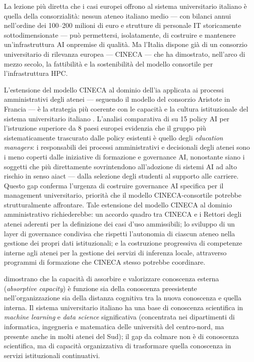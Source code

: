 La lezione più diretta che i casi europei offrono al sistema universitario italiano
è quella della consorzialità: nessun ateneo italiano medio --- con
bilanci annui nell'ordine dei 100--200 milioni di euro e strutture di personale
IT storicamente sottodimensionate --- può permettersi, isolatamente, di costruire
e mantenere un'infrastruttura AI \gls{onpremise} di qualità. Ma l'Italia
dispone già di un consorzio universitario di rilevanza europea --- CINECA ---
che ha dimostrato, nell'arco di mezzo secolo, la fattibilità e la sostenibilità
del modello consortile per l'infrastruttura HPC.

L'estensione del modello CINECA al dominio dell'\gls{ia} applicata ai processi
amministrativi degli atenei --- seguendo il modello del consorzio Aristote in
Francia --- è la strategia più coerente con le capacità e la cultura istituzionale
del sistema universitario italiano \parencite{EuroHPC_Leonardo}. L'analisi
comparativa di \textcite{Stracke2025AIpoliciesHE} su 15 policy AI per
l'istruzione superiore da 8 paesi europei evidenzia che il gruppo più
sistematicamente trascurato dalle policy esistenti è quello degli
\textit{education managers}: i responsabili dei processi amministrativi e
decisionali degli atenei sono i meno coperti dalle iniziative di formazione
e governance AI, nonostante siano i soggetti che più direttamente
sovrintendono all'adozione di sistemi AI ad alto rischio in senso
\gls{aiact} --- dalla selezione degli studenti al supporto alle carriere.
Questo gap conferma l'urgenza di costruire governance AI specifica per il
management universitario, priorità che il modello CINECA-consortile potrebbe
strutturalmente affrontare. Tale estensione del modello CINECA al dominio
amministrativo richiederebbe: un accordo quadro tra CINECA e i Rettori degli atenei aderenti
per la definizione dei casi d'uso ammissibili; lo sviluppo di un layer di
governance condivisa che rispetti l'autonomia di ciascun ateneo nella gestione
dei propri dati istituzionali; e la costruzione progressiva di competenze
interne agli atenei per la gestione dei servizi di inferenza locale, attraverso
programmi di formazione che CINECA stesso potrebbe coordinare.

\textcite{CohenLevinthal1990} dimostrano che la capacità di assorbire e valorizzare
conoscenza esterna (\textit{absorptive capacity}) è funzione sia della conoscenza
preesistente nell'organizzazione sia della distanza cognitiva tra la nuova
conoscenza e quella interna. Il sistema universitario italiano ha una base di
conoscenza scientifica in \textit{machine learning} e \textit{data science}
significativa (concentrata nei dipartimenti di informatica, ingegneria e
matematica delle università del centro-nord, ma presente anche in molti atenei
del Sud); il gap da colmare non è di conoscenza scientifica, ma di capacità
organizzativa di trasformare quella conoscenza in servizi istituzionali continuativi.

